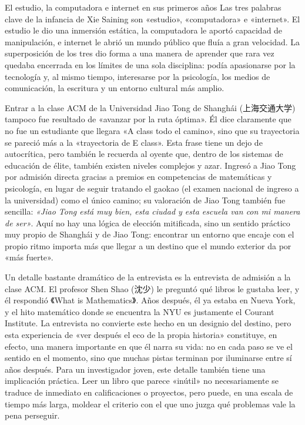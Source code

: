 \begin{knowledgebox}{El estudio, la computadora e internet en sus primeros años}
Las tres palabras clave de la infancia de Xie Saining son «estudio», «computadora» e «internet». El estudio le dio una inmersión estática, la computadora le aportó capacidad de manipulación, e internet le abrió un mundo público que fluía a gran velocidad. La superposición de los tres dio forma a una manera de aprender que rara vez quedaba encerrada en los límites de una sola disciplina: podía apasionarse por la tecnología y, al mismo tiempo, interesarse por la psicología, los medios de comunicación, la escritura y un entorno cultural más amplio.
\end{knowledgebox}

Entrar a la clase ACM de la Universidad Jiao Tong de Shanghái (上海交通大学) tampoco fue resultado de «avanzar por la ruta óptima». Él dice claramente que no fue un estudiante que llegara «A class todo el camino», sino que su trayectoria se pareció más a la «trayectoria de E class». Esta frase tiene un dejo de autocrítica, pero también le recuerda al oyente que, dentro de los sistemas de educación de élite, también existen niveles complejos y azar. Ingresó a Jiao Tong por admisión directa gracias a premios en competencias de matemáticas y psicología, en lugar de seguir tratando el gaokao (el examen nacional de ingreso a la universidad) como el único camino; su valoración de Jiao Tong también fue sencilla: \textit{«Jiao Tong está muy bien, esta ciudad y esta escuela van con mi manera de ser»}. Aquí no hay una lógica de elección mitificada, sino un sentido práctico muy propio de Shanghái y de Jiao Tong: encontrar un entorno que encaje con el propio ritmo importa más que llegar a un destino que el mundo exterior da por «más fuerte».

Un detalle bastante dramático de la entrevista es la entrevista de admisión a la clase ACM. El profesor Shen Shao (沈少) le preguntó qué libros le gustaba leer, y él respondió 《What is Mathematics》. Años después, él ya estaba en Nueva York, y el hito matemático donde se encuentra la NYU es justamente el Courant Institute. La entrevista no convierte este hecho en un designio del destino, pero esta experiencia de «ver después el eco de la propia historia» constituye, en efecto, una manera importante en que él narra su vida: no en cada paso se ve el sentido en el momento, sino que muchas pistas terminan por iluminarse entre sí años después. Para un investigador joven, este detalle también tiene una implicación práctica. Leer un libro que parece «inútil» no necesariamente se traduce de inmediato en calificaciones o proyectos, pero puede, en una escala de tiempo más larga, moldear el criterio con el que uno juzga qué problemas vale la pena perseguir.

